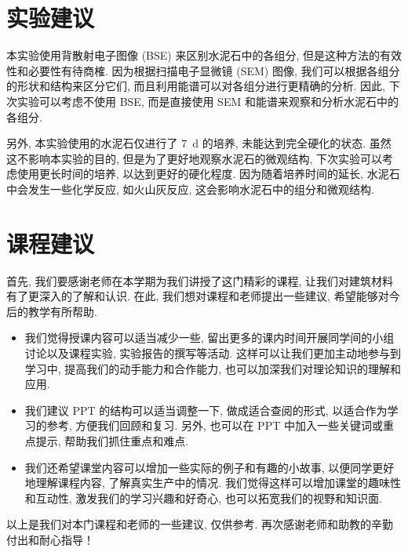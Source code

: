 
\section{实验建议}

本实验使用背散射电子图像 (BSE) 来区别水泥石中的各组分, 但是这种方法的有效性和必要性有待商榷.
因为根据扫描电子显微镜 (SEM) 图像, 我们可以根据各组分的形状和结构来区分它们, 而且利用能谱可以对各组分进行更精确的分析.
因此, 下次实验可以考虑不使用 BSE, 而是直接使用 SEM 和能谱来观察和分析水泥石中的各组分.

另外, 本实验使用的水泥石仅进行了 \SI{7}{\day} 的培养, 未能达到完全硬化的状态.
虽然这不影响本实验的目的, 但是为了更好地观察水泥石的微观结构, 下次实验可以考虑使用更长时间的培养, 以达到更好的硬化程度.
因为随着培养时间的延长, 水泥石中会发生一些化学反应, 如火山灰反应, 这会影响水泥石中的组分和微观结构.

\section{课程建议}


首先, 我们要感谢老师在本学期为我们讲授了这门精彩的课程, 让我们对建筑材料有了更深入的了解和认识.
在此, 我们想对课程和老师提出一些建议, 希望能够对今后的教学有所帮助.

\begin{itemize}
  \item 我们觉得授课内容可以适当减少一些, 留出更多的课内时间开展同学间的小组讨论以及课程实验, 实验报告的撰写等活动.
        这样可以让我们更加主动地参与到学习中, 提高我们的动手能力和合作能力, 也可以加深我们对理论知识的理解和应用.
  \item 我们建议 PPT 的结构可以适当调整一下, 做成适合查阅的形式, 以适合作为学习的参考, 方便我们回顾和复习.
        另外, 也可以在 PPT 中加入一些关键词或重点提示, 帮助我们抓住重点和难点.
  \item 我们还希望课堂内容可以增加一些实际的例子和有趣的小故事, 以便同学更好地理解课程内容, 了解真实生产中的情况.
        我们觉得这样可以增加课堂的趣味性和互动性, 激发我们的学习兴趣和好奇心, 也可以拓宽我们的视野和知识面.
\end{itemize}

以上是我们对本门课程和老师的一些建议, 仅供参考.
再次感谢老师和助教的辛勤付出和耐心指导！
